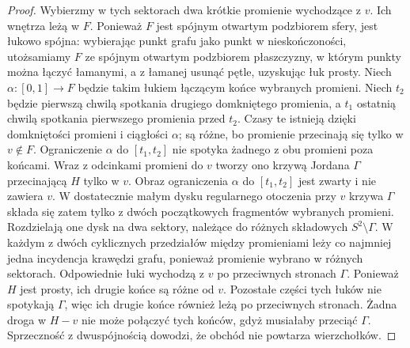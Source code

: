 \begin{proof}
Wybierzmy w tych sektorach dwa krótkie promienie
wychodzące z $v$. Ich wnętrza leżą w $F$.
Ponieważ $F$ jest spójnym otwartym podzbiorem
sfery, jest łukowo spójna: wybierając punkt grafu
jako punkt w nieskończoności, utożsamiamy $F$ ze
spójnym otwartym podzbiorem płaszczyzny, w którym
punkty można łączyć łamanymi, a z łamanej usunąć
pętle, uzyskując łuk prosty.
Niech $\alpha:[0,1]\to F$ będzie takim łukiem
łączącym końce wybranych promieni. Niech $t_2$
będzie pierwszą chwilą spotkania drugiego domkniętego
promienia, a $t_1$ ostatnią chwilą spotkania pierwszego
promienia przed $t_2$. Czasy te istnieją dzięki
domkniętości promieni i ciągłości $\alpha$; są różne,
bo promienie przecinają się tylko w $v\notin F$.
Ograniczenie $\alpha$ do $[t_1,t_2]$ nie spotyka
żadnego z obu promieni poza końcami.
Wraz z odcinkami promieni do $v$ tworzy ono
krzywą Jordana $\Gamma$ przecinającą $H$ tylko w $v$.
Obraz ograniczenia $\alpha$ do $[t_1,t_2]$ jest
zwarty i nie zawiera $v$. W dostatecznie małym
dysku regularnego otoczenia przy $v$ krzywa
$\Gamma$ składa się zatem tylko z dwóch
początkowych fragmentów wybranych promieni.
Rozdzielają one dysk na dwa sektory, należące
do różnych składowych $S^2\setminus\Gamma$.
W każdym z dwóch cyklicznych przedziałów
między promieniami leży co najmniej jedna
incydencja krawędzi grafu, ponieważ promienie
wybrano w różnych sektorach. Odpowiednie łuki
wychodzą z $v$ po przeciwnych stronach $\Gamma$.
Ponieważ $H$ jest prosty, ich drugie końce
są różne od $v$. Pozostałe części tych łuków
nie spotykają $\Gamma$, więc ich drugie końce
również leżą po przeciwnych stronach.
Żadna droga w $H-v$ nie może połączyć tych końców,
gdyż musiałaby przeciąć $\Gamma$.
Sprzeczność z dwuspójnością dowodzi, że obchód
nie powtarza wierzchołków.


\end{proof}

